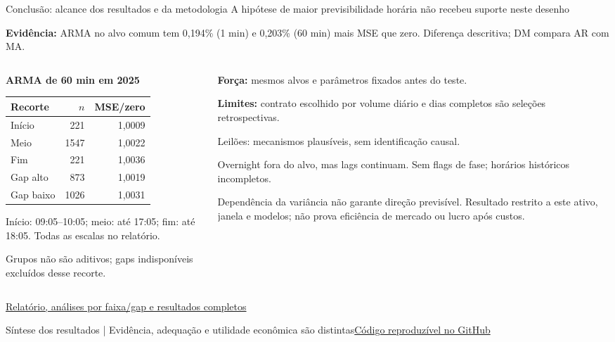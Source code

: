 \documentclass[aspectratio=169,10pt]{beamer}
\newcommand{\source}[2]{\par\vfill{\raggedright\tiny\color{muted}#1\quad\href{#2}{Código reproduzível no GitHub}\par}}
\newcommand{\tagline}[1]{{\small\color{teal}#1}\par\medskip}
\begin{document}
\begin{frame}[t]{Conclusão: alcance dos resultados e da metodologia}
\tagline{A hipótese de maior previsibilidade horária não recebeu suporte neste desenho}
\small\textbf{Evidência:} ARMA no alvo comum tem 0,194\% (1 min) e 0,203\% (60 min) mais MSE que zero. Diferença descritiva; DM compara AR com MA.\par\medskip\begin{columns}[T]\begin{column}{0.50\textwidth}\small\textbf{ARMA de 60 min em 2025}\par\smallskip\begin{tabular}{lrr}
\toprule
Recorte & $n$ & MSE/zero \\ \midrule
Início & 221 & 1,0009 \\
Meio & 1547 & 1,0022 \\
Fim & 221 & 1,0036 \\
Gap alto & 873 & 1,0019 \\
Gap baixo & 1026 & 1,0031 \\
\bottomrule
\end{tabular}\par
\scriptsize Início: 09:05--10:05; meio: até 17:05; fim: até 18:05. Todas as escalas no relatório.\par Grupos não são aditivos; gaps indisponíveis excluídos desse recorte.\end{column}\begin{column}{0.46\textwidth}\small\textbf{Força:} mesmos alvos e parâmetros fixados antes do teste.\par\smallskip \textbf{Limites:} contrato escolhido por volume diário e dias completos são seleções retrospectivas.\par\smallskip \alert{Leilões: mecanismos plausíveis, sem identificação causal.}\par\smallskip \scriptsize Overnight fora do alvo, mas lags continuam. Sem flags de fase; horários históricos incompletos.\par\smallskip Dependência da variância não garante direção previsível. Resultado restrito a este ativo, janela e modelos; não prova eficiência de mercado ou lucro após custos.\end{column}\end{columns}\medskip\scriptsize\href{https://github.com/avilarenan/EAD6034/blob/main/results/entrega_21_09/RELATORIO_21_09.md}{Relatório, análises por faixa/gap e resultados completos}

\source{Síntese dos resultados | Evidência, adequação e utilidade econômica são distintas}{https://github.com/avilarenan/EAD6034/blob/1782cade2ed752ce6b7c1b8b10c316445aef2626/src/ead6034/forecast_pipeline.py}
\end{frame}
\end{document}
